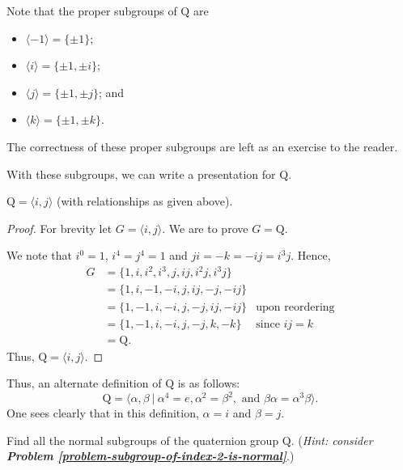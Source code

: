 Note that the proper subgroups of $\mathrm{Q}$ are
\begin{itemize}
    \item $\langle -1 \rangle = \{\pm1\}$;
    \item $\langle i \rangle = \{\pm1, \pm i\}$;
    \item $\langle j \rangle = \{\pm1, \pm j\}$; and
    \item $\langle k \rangle = \{\pm1, \pm k\}$.
\end{itemize}
The correctness of these proper subgroups are left as an exercise to the reader.

With these subgroups, we can write a presentation for $\mathrm{Q}$.

\begin{proposition}
    $\mathrm{Q} = \langle i, j \rangle$ (with relationships as given above).
\end{proposition}
\begin{proof}
    For brevity let $G = \langle i, j \rangle$. We are to prove $G = \mathrm{Q}$.

    We note that $i^0 = 1$, $i^4 = j^4 = 1$ and $ji = -k = -ij = i^3j$. Hence,
    \begin{align*}
        G &= \{1, i, i^2, i^3, j, ij, i^2j, i^3j\}\\
        &= \{1, i, -1, -i, j, ij, -j, -ij\}\\
        &= \{1, -1, i, -i, j, -j, ij, -ij\} & \text{upon reordering}\\
        &= \{1, -1, i, -i, j, -j, k, -k\} & \text{since } ij = k\\
        &= \mathrm{Q}.
    \end{align*}
    Thus, $\mathrm{Q} = \langle i, j \rangle$.
\end{proof}

Thus, an alternate definition of $\mathrm{Q}$ is as follows:
\[
    \mathrm{Q} = \langle \alpha, \beta \ | \ \alpha^4 = e, \alpha^2 = \beta^2, \text{ and } \beta\alpha = \alpha^3\beta \rangle.
\]
One sees clearly that in this definition, $\alpha = i$ and $\beta = j$.

\begin{exercise}\label{exercise-normal-subgroups-of-quarternion-group}
    Find all the normal subgroups of the quaternion group $\mathrm{Q}$.\newline
    (\textit{Hint: consider \textbf{Problem \ref{problem-subgroup-of-index-2-is-normal}}}.)
\end{exercise}

